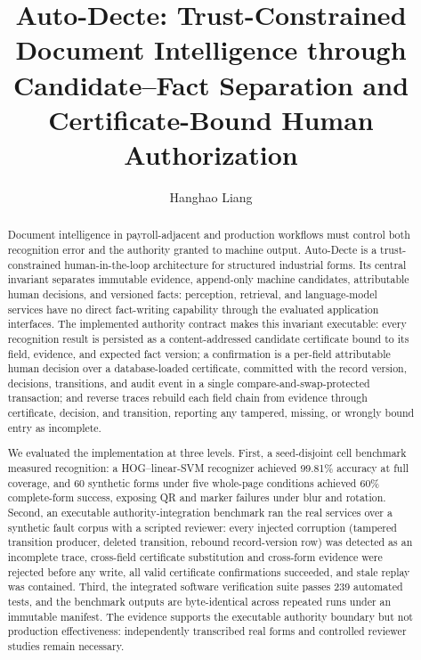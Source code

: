 \documentclass[preprint,12pt,authoryear]{elsarticle}
\begin{document}
\begin{frontmatter}
\title{Auto-Decte: Trust-Constrained Document Intelligence through Candidate--Fact Separation and Certificate-Bound Human Authorization}

\author[inst1]{Hanghao Liang}

\begin{abstract}
Document intelligence in payroll-adjacent and production workflows must control both recognition error and the authority granted to machine output. Auto-Decte is a trust-constrained human-in-the-loop architecture for structured industrial forms. Its central invariant separates immutable evidence, append-only machine candidates, attributable human decisions, and versioned facts: perception, retrieval, and language-model services have no direct fact-writing capability through the evaluated application interfaces. The implemented authority contract makes this invariant executable: every recognition result is persisted as a content-addressed candidate certificate bound to its field, evidence, and expected fact version; a confirmation is a per-field attributable human decision over a database-loaded certificate, committed with the record version, decisions, transitions, and audit event in a single compare-and-swap-protected transaction; and reverse traces rebuild each field chain from evidence through certificate, decision, and transition, reporting any tampered, missing, or wrongly bound entry as incomplete.

We evaluated the implementation at three levels. First, a seed-disjoint cell benchmark measured recognition: a HOG--linear-SVM recognizer achieved 99.81\% accuracy at full coverage, and 60 synthetic forms under five whole-page conditions achieved 60\% complete-form success, exposing QR and marker failures under blur and rotation. Second, an executable authority-integration benchmark ran the real services over a synthetic fault corpus with a scripted reviewer: every injected corruption (tampered transition producer, deleted transition, rebound record-version row) was detected as an incomplete trace, cross-field certificate substitution and cross-form evidence were rejected before any write, all valid certificate confirmations succeeded, and stale replay was contained. Third, the integrated software verification suite passes 239 automated tests, and the benchmark outputs are byte-identical across repeated runs under an immutable manifest. The evidence supports the executable authority boundary but not production effectiveness: independently transcribed real forms and controlled reviewer studies remain necessary.
\end{abstract}


\end{frontmatter}
\end{document}
